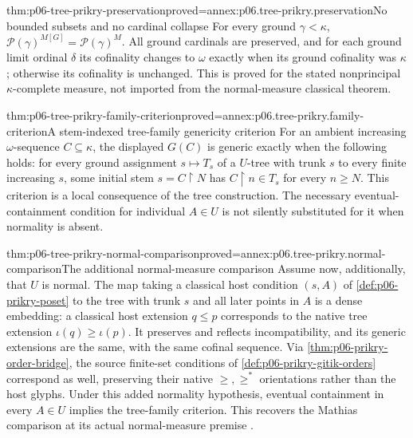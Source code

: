 \begin{hbtheorem}{thm:p06-tree-prikry-preservation}{proved=annex:p06.tree-prikry.preservation}{No bounded subsets and no cardinal collapse}
For every ground \(\gamma<\kappa\),
\(\mathcal P(\gamma)^{M[G]}=\mathcal P(\gamma)^M\).
All ground cardinals are preserved, and for each ground limit ordinal
\(\delta\) its cofinality changes to \(\omega\) exactly when its
ground cofinality was \(\kappa\); otherwise its cofinality is unchanged.
This is proved for the stated nonprincipal \(\kappa\)-complete measure,
not imported from the normal-measure classical theorem.
\end{hbtheorem}

\begin{hbtheorem}{thm:p06-tree-prikry-family-criterion}{proved=annex:p06.tree-prikry.family-criterion}{A stem-indexed tree-family genericity criterion}
For an ambient increasing \(\omega\)-sequence \(C\subseteq\kappa\),
the displayed \(G(C)\) is generic exactly when the following holds:
for every ground assignment \(s\mapsto T_s\) of a \(U\)-tree with
trunk \(s\) to every finite increasing \(s\), some initial stem
\(s=C\mathbin{\upharpoonright}N\) has
\(C\mathbin{\upharpoonright}n\in T_s\) for every \(n\geq N\).
This criterion is a local consequence of the tree construction. The
necessary eventual-containment condition for individual \(A\in U\)
is not silently substituted for it when normality is absent.
\end{hbtheorem}

\begin{hbtheorem}{thm:p06-tree-prikry-normal-comparison}{proved=annex:p06.tree-prikry.normal-comparison}{The additional normal-measure comparison}
Assume now, additionally, that \(U\) is normal. The map taking a
classical host condition \((s,A)\) of \cref{def:p06-prikry-poset}
to the tree with trunk \(s\) and all
later points in \(A\) is a dense embedding: a classical host extension
\(q\leq p\) corresponds to the native tree extension
\(\iota(q)\geq\iota(p)\). It preserves and reflects incompatibility,
and its generic extensions are the same, with the same cofinal sequence.
Via \cref{thm:p06-prikry-order-bridge}, the source finite-set conditions
of \cref{def:p06-prikry-gitik-orders} correspond as well, preserving
their native \(\geq,\geq^*\) orientations rather than the host glyphs.
Under this added normality hypothesis, eventual containment in every
\(A\in U\) implies the tree-family criterion. This recovers the
Mathias comparison at its actual normal-measure premise
\cite[Theorem~2.2]{Mathias1973PrikryNative}.
\end{hbtheorem}

